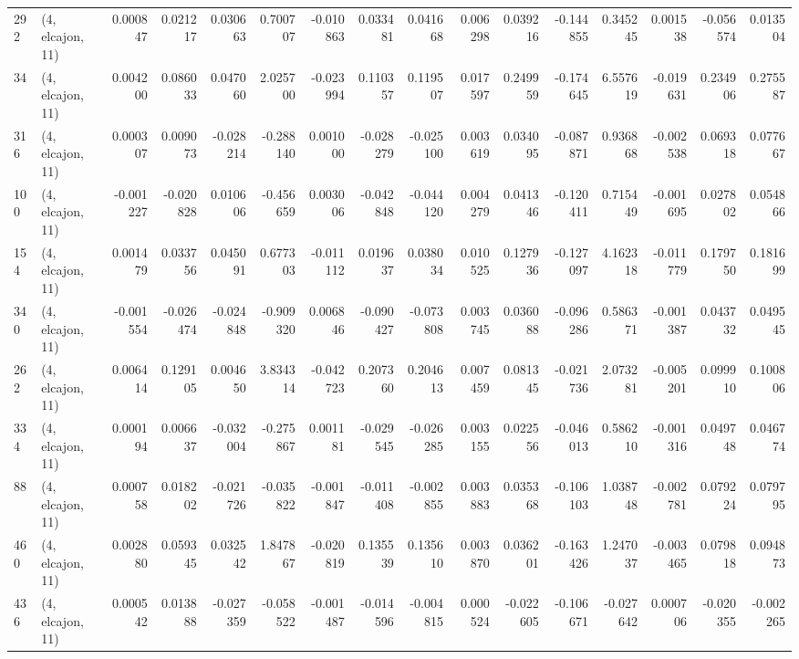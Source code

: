 \begin{tabular}{llrrrrrrrrrrrrrr}
292 &  (4, elcajon, 11) &   0.000847 &  0.021217 &  0.030663 &    0.700707 & -0.010863 &   0.033481 &   0.041668 &  0.006298 &  0.039216 & -0.144855 &    0.345245 &  0.001538 &  -0.056574 &   0.013504 \\
34  &  (4, elcajon, 11) &   0.004200 &  0.086033 &  0.047060 &    2.025700 & -0.023994 &   0.110357 &   0.119507 &  0.017597 &  0.249959 & -0.174645 &    6.557619 & -0.019631 &   0.234906 &   0.275587 \\
316 &  (4, elcajon, 11) &   0.000307 &  0.009073 & -0.028214 &   -0.288140 &  0.001000 &  -0.028279 &  -0.025100 &  0.003619 &  0.034095 & -0.087871 &    0.936868 & -0.002538 &   0.069318 &   0.077667 \\
100 &  (4, elcajon, 11) &  -0.001227 & -0.020828 &  0.010606 &   -0.456659 &  0.003006 &  -0.042848 &  -0.044120 &  0.004279 &  0.041346 & -0.120411 &    0.715449 & -0.001695 &   0.027802 &   0.054866 \\
154 &  (4, elcajon, 11) &   0.001479 &  0.033756 &  0.045091 &    0.677303 & -0.011112 &   0.019637 &   0.038034 &  0.010525 &  0.127936 & -0.127097 &    4.162318 & -0.011779 &   0.179750 &   0.181699 \\
340 &  (4, elcajon, 11) &  -0.001554 & -0.026474 & -0.024848 &   -0.909320 &  0.006846 &  -0.090427 &  -0.073808 &  0.003745 &  0.036088 & -0.096286 &    0.586371 & -0.001387 &   0.043732 &   0.049545 \\
262 &  (4, elcajon, 11) &   0.006414 &  0.129105 &  0.004650 &    3.834314 & -0.042723 &   0.207360 &   0.204613 &  0.007459 &  0.081345 & -0.021736 &    2.073281 & -0.005201 &   0.099910 &   0.100806 \\
334 &  (4, elcajon, 11) &   0.000194 &  0.006637 & -0.032004 &   -0.275867 &  0.001181 &  -0.029545 &  -0.026285 &  0.003155 &  0.022556 & -0.046013 &    0.586210 & -0.001316 &   0.049748 &   0.046774 \\
88  &  (4, elcajon, 11) &   0.000758 &  0.018202 & -0.021726 &   -0.035822 & -0.001847 &  -0.011408 &  -0.002855 &  0.003883 &  0.035368 & -0.106103 &    1.038748 & -0.002781 &   0.079224 &   0.079795 \\
460 &  (4, elcajon, 11) &   0.002880 &  0.059345 &  0.032542 &    1.847867 & -0.020819 &   0.135539 &   0.135610 &  0.003870 &  0.036201 & -0.163426 &    1.247037 & -0.003465 &   0.079818 &   0.094873 \\
436 &  (4, elcajon, 11) &   0.000542 &  0.013888 & -0.027359 &   -0.058522 & -0.001487 &  -0.014596 &  -0.004815 &  0.000524 & -0.022605 & -0.106671 &   -0.027642 &  0.000706 &  -0.020355 &  -0.002265 \\

\end{tabular}
